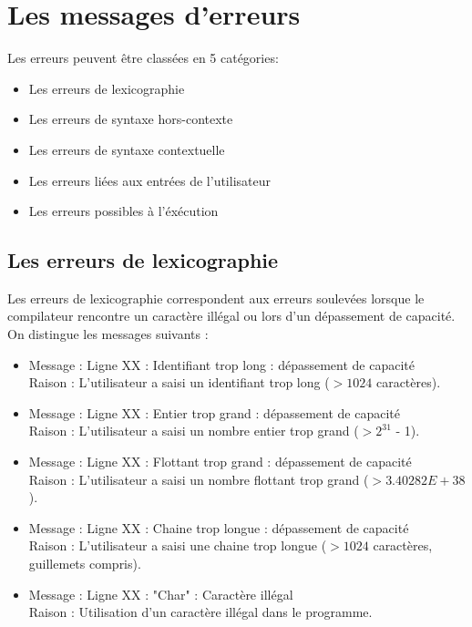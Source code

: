 \documentclass[11pt]{article}
\begin{document}
\newpage

   \section{Les messages d'erreurs}
   Les erreurs peuvent être classées en 5 catégories:
   \begin{itemize}
   \item Les erreurs de lexicographie
   \item Les erreurs de syntaxe hors-contexte
   \item Les erreurs de syntaxe contextuelle
   \item Les erreurs liées aux entrées de l'utilisateur
   \item Les erreurs possibles à l'éxécution
   \end{itemize}



   \subsection{Les erreurs de lexicographie}
      Les erreurs de lexicographie correspondent aux erreurs soulevées lorsque le compilateur rencontre un caractère illégal ou lors d'un dépassement de capacité.
      On distingue les messages suivants :
      \\
      \begin{itemize}
      \item   Message : Ligne XX : Identifiant trop long : dépassement de capacité \\
	      Raison : L'utilisateur a saisi un identifiant trop long ($>1024$ caractères).
      \item   Message : Ligne XX : Entier trop grand : dépassement de capacité \\
	      Raison : L'utilisateur a saisi un nombre entier trop grand ($> 2^{31}$ - 1).
      \item   Message : Ligne XX : Flottant trop grand : dépassement de capacité \\
	      Raison : L'utilisateur a saisi un nombre flottant trop grand ($> 3.40282E+38$).
      \item   Message : Ligne XX : Chaine trop longue : dépassement de capacité \\
	      Raison : L'utilisateur a saisi une chaine trop longue ($>1024$ caractères, guillemets compris).
      \item   Message : Ligne XX : "Char" : Caractère illégal \\
	      Raison : Utilisation d'un caractère illégal dans le programme.
      \end{itemize}
   \newpage
\end{document}

